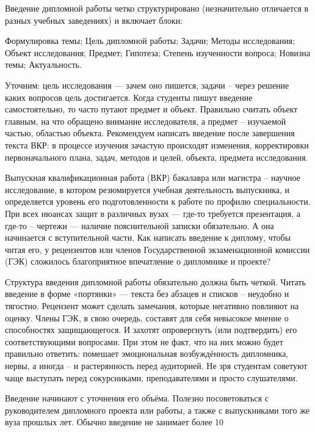 
Введение дипломной работы четко структурировано (незначительно отличается в разных учебных заведениях) и включает блоки:

    Формулировка темы;
    Цель дипломной работы;
    Задачи;
    Методы исследования;
    Объект исследования;
    Предмет;
    Гипотеза;
    Степень изученности вопроса;
    Новизна темы;
    Актуальность.

Уточним: цель исследования — зачем оно пишется, задачи – через решение каких вопросов цель достигается.
Когда студенты пишут введение самостоятельно, то часто путают предмет и объект. Правильно считать объект главным, на что обращено внимание исследователя, а предмет – изучаемой частью, областью объекта.
Рекомендуем написать введение после завершения текста ВКР: в процессе изучения зачастую происходят изменения, корректировки первоначального плана, задач, методов и целей, объекта, предмета исследования.

Выпускная квалификационная работа (ВКР) бакалавра или магистра – научное исследование, в котором резюмируется учебная деятельность выпускника, и определяется уровень его подготовленности к работе по профилю специальности. При всех нюансах защит в различных вузах — где-то требуется презентация, а где-то – чертежи — наличие пояснительной записки обязательно. А она начинается с вступительной части. Как написать введение к диплому, чтобы читая его, у рецензентов или членов Государственной экзаменационной комиссии (ГЭК)  сложилось благоприятное впечатление о дипломнике и проекте?

Структура введения дипломной работы обязательно должна быть четкой. Читать введение в форме «портянки» — текста без абзацев и списков – неудобно и тягостно. Рецензент может сделать замечания, которые негативно повлияют на оценку. Члены ГЭК, в свою очередь, составят для себя невысокое мнение о способностях защищающегося. И захотят опровергнуть (или подтвердить) его соответствующими вопросами. При этом не факт, что на них можно будет правильно ответить: помешает эмоциональная возбуждённость дипломника, нервы, а иногда – и растерянность перед аудиторией. Не зря студентам советуют чаще выступать перед сокурсниками, преподавателями и просто слушателями.

Введение начинают с уточнения его объёма. Полезно посоветоваться с руководителем дипломного проекта или работы, а также  с выпускниками того же вуза прошлых лет. Обычно введение не занимает более 10%

